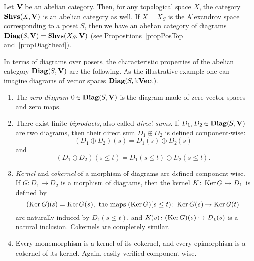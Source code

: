 Let $\mathbf{V}$ be an abelian category. Then, for any topological space $X$, the category $\mathbf{Shvs}(X,\mathbf{V})$ is an abelian category as well. If $X=X_S$ is the Alexandrov space corresponding to a poset $S$, then we have an abelian category of diagrams $\mathbf{Diag}(S,\mathbf{V})=\mathbf{Shvs}(X_S,\mathbf{V})$ (see Propositions~\ref{propPosTop} and~\ref{propDiagSheaf}).

\begin{con}\label{conDiagIsAbelian}
In terms of diagrams over posets, the characteristic properties of the abelian category $\mathbf{Diag}(S,\mathbf{V})$ are the following. As the illustrative example one can imagine diagrams of vector spaces $\mathbf{Diag}(S,\Bbbk\mathbf{Vect})$.
\begin{enumerate}
  \item The \emph{zero diagram} $0\in \mathbf{Diag}(S,\mathbf{V})$ is the diagram made of zero vector spaces and zero maps.
  \item There exist finite \emph{biproducts}, also called \emph{direct sums}. If $D_1,D_2\in \mathbf{Diag}(S,\mathbf{V})$ are two diagrams, then their direct sum $D_1\oplus D_2$ is defined component-wise:
      \[
      (D_1\oplus D_2)(s)=D_1(s)\oplus D_2(s)
      \]
      and
      \[
      (D_1\oplus D_2)(s\leq t)=D_1(s\leq t)\oplus D_2(s\leq t).
      \]
  \item \emph{Kernel} and \emph{cokernel} of a morphism of diagrams are defined component-wise. If $G\colon D_1\to D_2$ is a morphism of diagrams, then the kernel $K\colon \operatorname{Ker} G\hookrightarrow D_1$ is defined by
      \[
      (\operatorname{Ker} G)(s)=\operatorname{Ker} G(s),\mbox{ the maps } (\operatorname{Ker} G)(s\leq t)\colon \operatorname{Ker} G(s)\to \operatorname{Ker} G(t)
      \]
      are naturally induced by $D_1(s\leq t)$, and $K(s)\colon (\operatorname{Ker} G)(s)\hookrightarrow D_1(s)$ is a natural inclusion. Cokernels are completely similar.
  \item Every monomorphism is a kernel of its cokernel, and every epimorphism is a cokernel of its kernel. Again, easily verified component-wise.
\end{enumerate}
\end{con}


